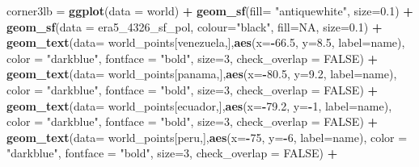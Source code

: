 \documentclass[12pt,twoside]{reedthesis}
\newenvironment{Shaded}{\begin{snugshade}}{\end{snugshade}}
\newcommand{\DataTypeTok}[1]{\textcolor[rgb]{0.13,0.29,0.53}{#1}}
\newcommand{\DecValTok}[1]{\textcolor[rgb]{0.00,0.00,0.81}{#1}}
\newcommand{\FloatTok}[1]{\textcolor[rgb]{0.00,0.00,0.81}{#1}}
\newcommand{\KeywordTok}[1]{\textcolor[rgb]{0.13,0.29,0.53}{\textbf{#1}}}
\newcommand{\NormalTok}[1]{#1}
\newcommand{\OperatorTok}[1]{\textcolor[rgb]{0.81,0.36,0.00}{\textbf{#1}}}
\newcommand{\OtherTok}[1]{\textcolor[rgb]{0.56,0.35,0.01}{#1}}
\newcommand{\StringTok}[1]{\textcolor[rgb]{0.31,0.60,0.02}{#1}}
\begin{document}
\begin{Shaded}
\begin{Highlighting}[]
\NormalTok{corner3lb =}\StringTok{ }\KeywordTok{ggplot}\NormalTok{(}\DataTypeTok{data =}\NormalTok{ world) }\OperatorTok{+}\StringTok{ }
\StringTok{  }\KeywordTok{geom_sf}\NormalTok{(}\DataTypeTok{fill=} \StringTok{"antiquewhite"}\NormalTok{,  }\DataTypeTok{size=}\FloatTok{0.1}\NormalTok{) }\OperatorTok{+}\StringTok{ }
\StringTok{  }\KeywordTok{geom_sf}\NormalTok{(}\DataTypeTok{data =}\NormalTok{ era5_}\DecValTok{4326}\NormalTok{_sf_pol, }\DataTypeTok{colour=}\StringTok{"black"}\NormalTok{, }\DataTypeTok{fill=}\OtherTok{NA}\NormalTok{, }\DataTypeTok{size=}\FloatTok{0.1}\NormalTok{) }\OperatorTok{+}\StringTok{ }
\StringTok{  }\KeywordTok{geom_text}\NormalTok{(}\DataTypeTok{data=}\NormalTok{ world_points[venezuela,],}\KeywordTok{aes}\NormalTok{(}\DataTypeTok{x=}\OperatorTok{-}\FloatTok{66.5}\NormalTok{, }\DataTypeTok{y=}\FloatTok{8.5}\NormalTok{, }\DataTypeTok{label=}\NormalTok{name), }\DataTypeTok{color =} \StringTok{"darkblue"}\NormalTok{, }\DataTypeTok{fontface =} \StringTok{"bold"}\NormalTok{, }\DataTypeTok{size=}\DecValTok{3}\NormalTok{, }\DataTypeTok{check_overlap =} \OtherTok{FALSE}\NormalTok{) }\OperatorTok{+}
\StringTok{  }\KeywordTok{geom_text}\NormalTok{(}\DataTypeTok{data=}\NormalTok{ world_points[panama,],}\KeywordTok{aes}\NormalTok{(}\DataTypeTok{x=}\OperatorTok{-}\FloatTok{80.5}\NormalTok{, }\DataTypeTok{y=}\FloatTok{9.2}\NormalTok{, }\DataTypeTok{label=}\NormalTok{name), }\DataTypeTok{color =} \StringTok{"darkblue"}\NormalTok{, }\DataTypeTok{fontface =} \StringTok{"bold"}\NormalTok{, }\DataTypeTok{size=}\DecValTok{3}\NormalTok{, }\DataTypeTok{check_overlap =} \OtherTok{FALSE}\NormalTok{) }\OperatorTok{+}\StringTok{ }
\StringTok{  }\KeywordTok{geom_text}\NormalTok{(}\DataTypeTok{data=}\NormalTok{ world_points[ecuador,],}\KeywordTok{aes}\NormalTok{(}\DataTypeTok{x=}\OperatorTok{-}\FloatTok{79.2}\NormalTok{, }\DataTypeTok{y=}\OperatorTok{-}\DecValTok{1}\NormalTok{, }\DataTypeTok{label=}\NormalTok{name), }\DataTypeTok{color =} \StringTok{"darkblue"}\NormalTok{, }\DataTypeTok{fontface =} \StringTok{"bold"}\NormalTok{, }\DataTypeTok{size=}\DecValTok{3}\NormalTok{, }\DataTypeTok{check_overlap =} \OtherTok{FALSE}\NormalTok{) }\OperatorTok{+}
\StringTok{  }\KeywordTok{geom_text}\NormalTok{(}\DataTypeTok{data=}\NormalTok{ world_points[peru,],}\KeywordTok{aes}\NormalTok{(}\DataTypeTok{x=}\OperatorTok{-}\DecValTok{75}\NormalTok{, }\DataTypeTok{y=}\OperatorTok{-}\DecValTok{6}\NormalTok{, }\DataTypeTok{label=}\NormalTok{name), }\DataTypeTok{color =} \StringTok{"darkblue"}\NormalTok{, }\DataTypeTok{fontface =} \StringTok{"bold"}\NormalTok{, }\DataTypeTok{size=}\DecValTok{3}\NormalTok{, }\DataTypeTok{check_overlap =} \OtherTok{FALSE}\NormalTok{) }\OperatorTok{+}

\end{Highlighting}
\end{Shaded}
\end{document}
